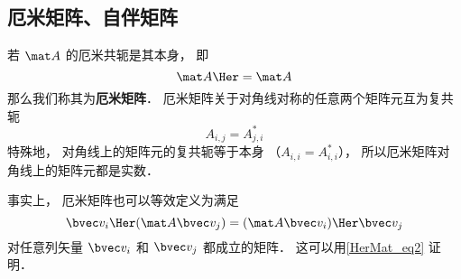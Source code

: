 \subsection{厄米矩阵、自伴矩阵}
若 $\mat A$ 的厄米共轭是其本身， 即
\begin{equation}
\mat A\Her = \mat A
\end{equation}
那么我们称其为\textbf{厄米矩阵}． 厄米矩阵关于对角线对称的任意两个矩阵元互为复共轭
\begin{equation}
A_{i,j} = A_{j,i}^*
\end{equation}
特殊地， 对角线上的矩阵元的复共轭等于本身 （$A_{i,i} = A_{i,i}^*$）， 所以厄米矩阵对角线上的矩阵元都是实数．

事实上， 厄米矩阵也可以等效定义为满足
\begin{equation}
\bvec v_i\Her (\mat A \bvec v_j) = (\mat A \bvec v_i)\Her \bvec v_j
\end{equation}
对任意列矢量 $\bvec v_i$ 和 $\bvec v_j$ 都成立的矩阵． 这可以用\autoref{HerMat_eq2} 证明．